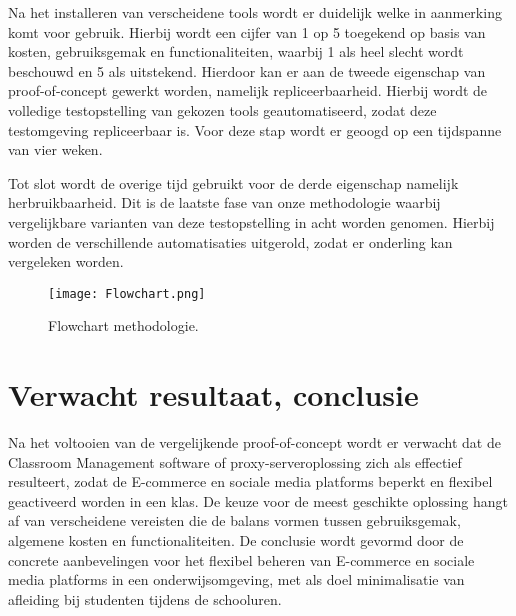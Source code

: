 Na het installeren van verscheidene tools wordt er duidelijk welke in aanmerking komt voor gebruik. Hierbij wordt een cijfer van 1 op 5 toegekend op basis van kosten, gebruiksgemak en functionaliteiten, waarbij 1 als heel slecht wordt beschouwd en 5 als uitstekend. Hierdoor kan er aan de tweede eigenschap van proof-of-concept gewerkt worden, namelijk repliceerbaarheid. Hierbij wordt de volledige testopstelling van gekozen tools geautomatiseerd, zodat deze testomgeving repliceerbaar is. Voor deze stap wordt er geoogd op een tijdspanne van vier weken. \newline

Tot slot wordt de overige tijd gebruikt voor de derde eigenschap namelijk herbruikbaarheid. Dit is de laatste fase van onze methodologie waarbij vergelijkbare varianten van deze testopstelling in acht worden genomen. Hierbij worden de verschillende automatisaties uitgerold, zodat er onderling kan vergeleken worden.  

\begin{figure}[h]
    \centering
    \texttt{[image: Flowchart.png]}
    \caption{Flowchart methodologie.}
    \label{fig:Flowchart}
\end{figure}
\clearpage
\section{Verwacht resultaat, conclusie}%
\label{sec:verwachte_resultaten}

Na het voltooien van de vergelijkende proof-of-concept wordt er verwacht dat de Classroom Management software of proxy-serveroplossing zich als effectief resulteert, zodat de E-commerce en sociale media platforms beperkt en flexibel geactiveerd worden in een klas. De keuze voor de meest geschikte oplossing hangt af van verscheidene vereisten die de balans vormen tussen gebruiksgemak, algemene kosten en functionaliteiten. De conclusie wordt gevormd door de concrete aanbevelingen voor het flexibel beheren van E-commerce en sociale media platforms in een onderwijsomgeving, met als doel minimalisatie van afleiding bij studenten tijdens de schooluren.